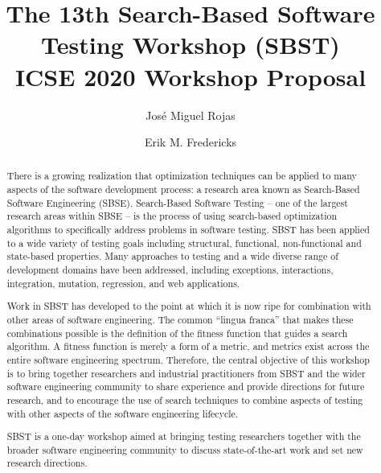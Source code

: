 \documentclass[sigconf,review]{acmart}
\begin{document}
\title{The 13th Search-Based Software Testing Workshop (SBST)\\ ICSE 2020 Workshop Proposal}


\author{Jos\'e Miguel Rojas}

\author{Erik M. Fredericks}

\begin{abstract}
  There is a growing realization that optimization techniques can be
  applied to many aspects of the software development process: a
  research area known as Search-Based Software Engineering
  (SBSE). Search-Based Software Testing -- one of the largest research
  areas within SBSE -- is the process of using search-based
  optimization algorithms to specifically address problems in software
  testing. SBST has been applied to a wide variety of testing goals
  including structural, functional, non-functional and state-based
  properties. Many approaches to testing and a wide diverse range of
  development domains have been addressed, including exceptions,
  interactions, integration, mutation, regression, and web
  applications.

  Work in SBST has developed to the point at which it is now ripe for
  combination with other areas of software engineering. The common
  ``lingua franca'' that makes these combinations possible is the
  definition of the fitness function that guides a search algorithm. A
  fitness function is merely a form of a metric, and metrics exist
  across the entire software engineering spectrum. Therefore, the
  central objective of this workshop is to bring together researchers
  and industrial practitioners from SBST and the wider software
  engineering community to share experience and provide directions for
  future research, and to encourage the use of search techniques to
  combine aspects of testing with other aspects of the software
  engineering lifecycle.

  SBST is a one-day workshop aimed at bringing testing researchers
  together with the broader software engineering community to discuss
  state-of-the-art work and set new research directions.
\end{abstract}

\end{document}
